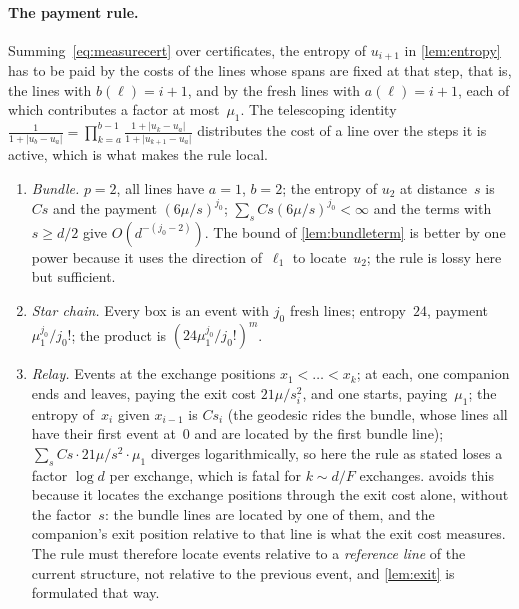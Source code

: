 \documentclass[11pt,letterpaper]{article}
\begin{document}
\paragraph{The payment rule.} Summing~\eqref{eq:measurecert} over certificates, the entropy of $u_{i+1}$ in \cref{lem:entropy} has to be paid by the costs of the lines whose spans are fixed at that step, that is, the lines with $b(\ell)=i+1$, and by the fresh lines with $a(\ell)=i+1$, each of which contributes a factor at most~$\mu_1$. The telescoping identity $\frac1{1+\lvert u_b-u_a\rvert}=\prod_{k=a}^{b-1}\frac{1+\lvert u_k-u_a\rvert}{1+\lvert u_{k+1}-u_a\rvert}$ distributes the cost of a line over the steps it is active, which is what makes the rule local.

\begin{enumerate}
  \item \emph{Bundle.} $p=2$, all lines have $a=1$, $b=2$; the entropy of $u_2$ at distance~$s$ is $Cs$ and the payment $(6\mu/s)^{j_0}$; $\sum_s Cs(6\mu/s)^{j_0}<\infty$ and the terms with $s\ge d/2$ give $O(d^{-(j_0-2)})$. The bound of \cref{lem:bundleterm} is better by one power because it uses the direction of~$\ell_1$ to locate~$u_2$; the rule is lossy here but sufficient.
  \item \emph{Star chain.} Every box is an event with $j_0$ fresh lines; entropy~$24$, payment $\mu_1^{j_0}/j_0!$; the product is $(24\mu_1^{j_0}/j_0!)^m$.
  \item \emph{Relay.} Events at the exchange positions $x_1<\dots<x_{k}$; at each, one companion ends and leaves, paying the exit cost $21\mu/s_i^2$, and one starts, paying~$\mu_1$; the entropy of~$x_i$ given $x_{i-1}$ is $Cs_i$ (the geodesic rides the bundle, whose lines all have their first event at~$0$ and are located by the first bundle line); $\sum_{s}Cs\cdot21\mu/s^2\cdot\mu_1$ diverges logarithmically, so here the rule as stated loses a factor $\log d$ per exchange, which is fatal for $k\sim d/F$ exchanges.  avoids this because it locates the exchange positions through the exit cost alone, without the factor~$s$: the bundle lines are located by one of them, and the companion's exit position relative to that line is what the exit cost measures. The rule must therefore locate events relative to a \emph{reference line} of the current structure, not relative to the previous event, and \cref{lem:exit} is formulated that way.
\end{enumerate}
\end{document}
